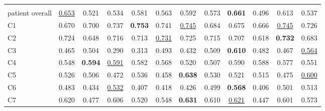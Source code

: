 \begin{minipage}{\textwidth}
{\begin{tabular}{@{}lccccccccccc@{}}
\addlinespace
\multicolumn{12}{@{}l}{\textit{joint}} \\
patient overall & \underline{0.653} & 0.521 & 0.534 & 0.581 & 0.563 & 0.592 & 0.573 & \textbf{0.661} & 0.496 & 0.613 & 0.537 \\
C1 & 0.670 & 0.700 & 0.737 & \textbf{0.753} & 0.741 & \underline{0.745} & 0.684 & 0.675 & 0.666 & \underline{0.745} & 0.726 \\
C2 & 0.724 & 0.648 & 0.716 & 0.713 & \underline{0.731} & 0.725 & 0.715 & 0.707 & 0.618 & \textbf{0.732} & 0.683 \\
C3 & 0.465 & 0.504 & 0.290 & 0.313 & 0.493 & 0.432 & 0.509 & \textbf{0.610} & 0.482 & 0.467 & \underline{0.564} \\
C4 & 0.548 & \textbf{0.594} & \underline{0.591} & 0.582 & 0.568 & 0.520 & 0.507 & 0.590 & 0.588 & 0.577 & 0.551 \\
C5 & 0.526 & 0.506 & 0.472 & 0.536 & 0.458 & \textbf{0.638} & 0.530 & 0.521 & 0.515 & 0.475 & \underline{0.600} \\
C6 & 0.483 & 0.434 & \underline{0.532} & 0.407 & 0.418 & 0.426 & 0.499 & \textbf{0.568} & 0.406 & 0.501 & 0.513 \\
C7 & 0.620 & 0.477 & 0.606 & 0.520 & 0.548 & \textbf{0.631} & 0.610 & \underline{0.621} & 0.447 & 0.601 & 0.573 \\
\bottomrule
\end{tabular}
}\end{minipage}
\par\bigskip
